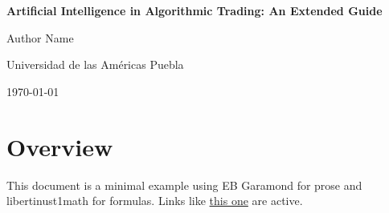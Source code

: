 \documentclass[10pt,a4paper]{article} %
\begin{document}
\begin{titlepage}
  \centering
  \vspace*{4cm}
  {\Huge\bfseries Artificial Intelligence in Algorithmic Trading: An Extended Guide\par}
  \vspace{2cm}
  {\Large Author Name\par}
  \vspace{1cm}
  {\large Universidad de las Américas Puebla\par}
  \vfill
  {\large \today\par}
\end{titlepage}

\begin{abstract}
This document provides a template for reports in the "AI in Financial Services" course, using EB Garamond for prose and Libertinus Math for formulas. It includes a cover page, abstract, table of contents, and sample sections for math and text. Additional content demonstrates tables, code, and references.
\end{abstract}

\tableofcontents
\thispagestyle{empty}
\newpage

\section{Overview}
This document is a minimal example using EB Garamond for prose and libertinust1math for formulas.
Links like \href{https://example.com}{this one} are active.
\end{document}
